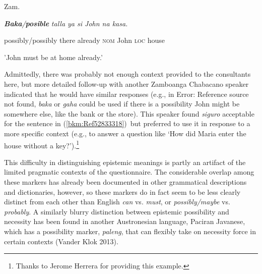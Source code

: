 \begin{listWWNumiileveli}
\item 
\begin{stylelsLanginfo}
\label{bkm:Ref52833318}Zam.
\end{stylelsLanginfo}
\end{listWWNumiileveli}
\begin{stylelsLanginfo}
\textbf{\textit{Baka}}\textit{/}\textbf{\textit{posible}}\textit{ talla ya si John na kasa.}
\end{stylelsLanginfo}

\begin{stylelsLanginfo}
possibly/possibly there already \textsc{nom} John \textsc{loc} house
\end{stylelsLanginfo}

\begin{stylelsLanginfo}
{}'John must be at home already.'
\end{stylelsLanginfo}

\begin{styleStandard}
Admittedly, there was probably not enough context provided to the consultants here, but more detailed follow-up with another Zamboanga Chabacano speaker indicated that he would have similar responses (e.g., in Error: Reference source not found, \textit{baka} or \textit{gaha }could be used if there is a possibility John might be somewhere else, like the bank or the store). This speaker found \textit{siguro} acceptable for the sentence in (\ref{bkm:Ref52833318})\ but preferred to use it in response to a more specific context (e.g., to answer a question like ‘How did Maria enter the house without a key?’).\footnote{ Thanks to Jerome Herrera for providing this example.}
\end{styleStandard}

\begin{styleStandard}
This difficulty in distinguishing epistemic meanings is partly an artifact of the limited pragmatic contexts of the questionnaire. The considerable overlap among these markers has already been documented in other grammatical descriptions and dictionaries, however, so these markers do in fact seem to be less clearly distinct from each other than English \textit{can} vs. \textit{must}, or \textit{possibly/maybe }vs.\textit{ probably}. A similarly blurry distinction between epistemic possibility and necessity has been found in another Austronesian language, Paciran Javanese, which has a possibility marker, \textit{paleng}, that can flexibly take on necessity force in certain contexts (Vander Klok 2013).
\end{styleStandard}

